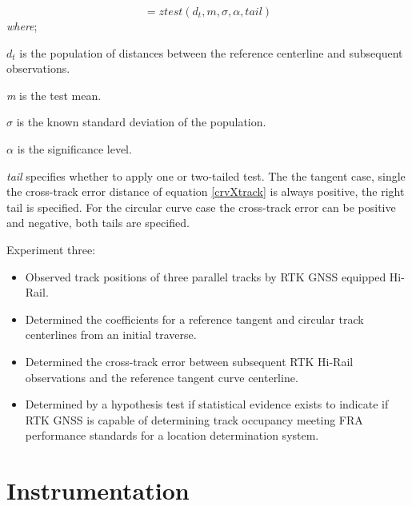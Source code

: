 \begin{equation}
[h,sig,ci,zval] = ztest(d_t,m,\sigma,\alpha,tail)
\label{zTan}
\end{equation}
\emph{where};

${d_t}$ is the population of distances between the reference centerline and subsequent observations.

\emph{m} is the test mean.

${\sigma}$ is the known standard deviation of the population.

${\alpha}$ is the significance level.

\emph{tail} specifies whether to apply one or two-tailed test. The the tangent case, single the cross-track error distance of equation \ref{crvXtrack} is always positive, the right tail is specified. For the circular curve case the cross-track error can be positive and negative, both tails are specified.

Experiment three:
\begin{itemize}
\item Observed track positions of three parallel tracks by RTK GNSS equipped Hi-Rail.
\item Determined the coefficients for a reference tangent and circular track centerlines from an initial traverse.

\item Determined the cross-track error between subsequent RTK Hi-Rail observations and the reference tangent curve centerline.

\item Determined by a hypothesis test if statistical evidence exists to indicate if RTK GNSS is capable of determining track occupancy meeting FRA performance standards for a location determination system.
\end{itemize}

\section{Instrumentation}

